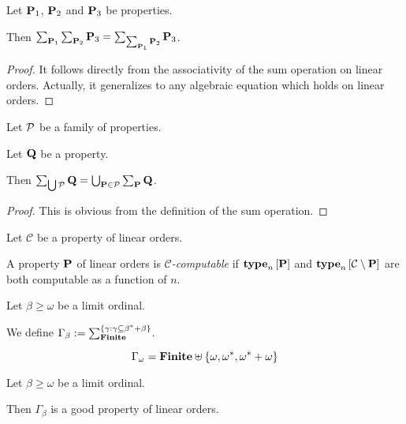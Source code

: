 \begin{lemma}
  Let $\mathbf{P}_1$, $\mathbf{P}_2$ and $\mathbf{P}_3$ be properties.

  Then $\sum_{\mathbf{P}_1}{\sum_{\mathbf{P}_2}{\mathbf{P}_3}} = \sum_{\sum_{\mathbf{P}_1}{\mathbf{P}_2}}{\mathbf{P}_3}$.
\end{lemma}

\begin{proof}
  It follows directly from the associativity of the sum operation on
  linear orders. Actually, it generalizes to any algebraic equation
  which holds on linear orders.
\end{proof}

\begin{lemma}
  Let $\mathcal{P}$ be a family of properties.
  
  Let $\mathbf{Q}$ be a property.

  Then $\sum_{\bigcup \mathcal{P}}{\mathbf{Q}} = \bigcup_{\mathbf{P} \in \mathcal{P}}{\sum_{\mathbf{P}}{\mathbf{Q}}}$.
\end{lemma}

\begin{proof}
  This is obvious from the definition of the sum operation.
\end{proof}

\begin{definition}
  Let $\mathcal{C}$ be a property of linear orders.

  A property $\mathbf{P}$ of linear orders is \emph{$\mathcal{C}$-computable} if
  $\mathbf{type}_{n} \left[ {\mathbf{P}} \right]$ and $\mathbf{type}_{n} \left[ {\mathcal{C} \setminus \mathbf{P}} \right]$ are both
  computable as a function of $n$.
\end{definition}                                                                                                                                                                                                                                                                                                                                                                                                             


\begin{definition}
  Let $\beta \ge \omega$ be a limit ordinal.

  We define $\Gamma_{\beta} := \sum_{\mathbf{Finite}}^{\left\{ {\gamma : \gamma \subseteq \beta^\ast + \beta} \right\}}$.
\end{definition}

\begin{example}
  \[
    \Gamma_{\omega} = \mathbf{Finite} \uplus \left\{ {\omega, \omega^\ast, \omega^\ast + \omega} \right\}
  \]
\end{example}

\begin{observation}
  Let $\beta \ge \omega$ be a limit ordinal.

  Then $\Gamma_{\beta}$ is a good property of linear orders.
\end{observation}